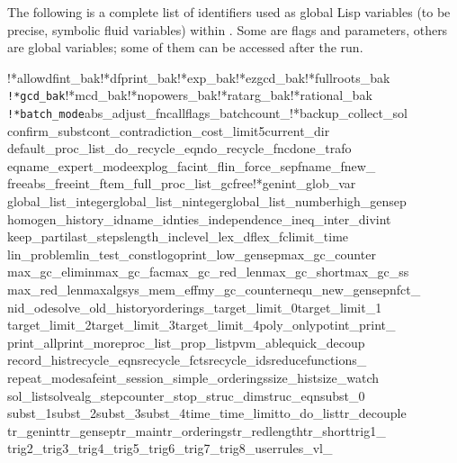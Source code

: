 The following is a complete list of identifiers used as global Lisp
variables (to be precise, symbolic fluid variables) within
.  Some are flags and parameters, others are global
variables; some of them can be accessed after the  run.
\begin{flushleft}\ttfamily
  !*allowdfint\_bak\quad !*dfprint\_bak\quad !*exp\_bak\quad !*ezgcd\_bak\quad !*fullroots\_bak\quad
  \verb|!*gcd_bak|\quad !*mcd\_bak\quad !*nopowers\_bak\quad !*ratarg\_bak\quad !*rational\_bak\quad
  \verb|!*batch_mode|\quad abs\_\quad adjust\_fnc\quad allflags\_\quad batchcount\_\quad !*backup\_\quad collect\_sol\quad
  confirm\_subst\quad cont\_\quad contradiction\_\quad cost\_limit5\quad current\_dir\quad
  default\_proc\_list\_\quad do\_recycle\_eqn\quad do\_recycle\_fnc\quad done\_trafo\quad
  eqname\_\quad expert\_mode\quad explog\_\quad facint\_\quad flin\_\quad force\_sep\quad fname\_\quad fnew\_\quad
  freeabs\_\quad freeint\_\quad ftem\_\quad full\_proc\_list\_\quad gcfree!*\quad genint\_\quad glob\_var\quad
  global\_list\_integer\quad global\_list\_ninteger\quad global\_list\_number\quad high\_gensep\quad
  homogen\_\quad history\_\quad idname\_\quad idnties\_\quad independence\_\quad ineq\_\quad inter\_divint\quad
  keep\_parti\quad last\_steps\quad length\_inc\quad level\_\quad lex\_df\quad lex\_fc\quad limit\_time\quad
  lin\_problem\quad lin\_test\_const\quad logoprint\_\quad low\_gensep\quad max\_gc\_counter\quad
  max\_gc\_elimin\quad max\_gc\_fac\quad max\_gc\_red\_len\quad max\_gc\_short\quad max\_gc\_ss\quad
  max\_red\_len\quad maxalgsys\_\quad mem\_eff\quad my\_gc\_counter\quad nequ\_\quad new\_gensep\quad nfct\_\quad
  nid\_\quad odesolve\_\quad old\_history\quad orderings\_\quad target\_limit\_0\quad target\_limit\_1\quad
  target\_limit\_2\quad target\_limit\_3\quad target\_limit\_4\quad poly\_only\quad potint\_\quad print\_\quad
  print\_all\quad print\_more\quad proc\_list\_\quad prop\_list\quad pvm\_able\quad quick\_decoup\quad
  record\_hist\quad recycle\_eqns\quad recycle\_fcts\quad recycle\_ids\quad reducefunctions\_\quad
  repeat\_mode\quad safeint\_\quad session\_\quad simple\_orderings\quad size\_hist\quad size\_watch\quad
  sol\_list\quad solvealg\_\quad stepcounter\_\quad stop\_\quad struc\_dim\quad struc\_eqn\quad subst\_0\quad
  subst\_1\quad subst\_2\quad subst\_3\quad subst\_4\quad time\_\quad time\_limit\quad to\_do\_list\quad tr\_decouple\quad
  tr\_genint\quad tr\_gensep\quad tr\_main\quad tr\_orderings\quad tr\_redlength\quad tr\_short\quad trig1\_\quad
  trig2\_\quad trig3\_\quad trig4\_\quad trig5\_\quad trig6\_\quad trig7\_\quad trig8\_\quad userrules\_\quad vl\_
\end{flushleft}

